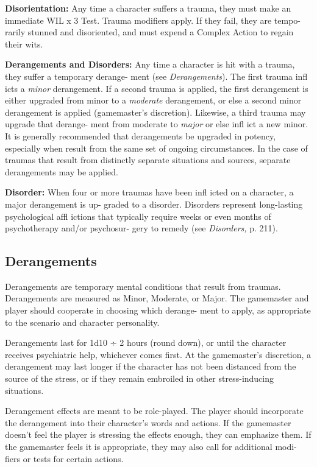 \textbf{Disorientation:} Any time a character suffers a 
trauma, they must make an immediate WIL x 3 Test. 
Trauma modifiers apply. If they fail, they are tempo-
rarily stunned and disoriented, and must expend a 
Complex Action to regain their wits.

\textbf{Derangements and Disorders:} Any time a character 
is hit with a trauma, they suffer a temporary derange-
ment (see \textit{Derangements}). The first trauma infl icts a 
\textit{minor} derangement. If a second trauma is applied, 
the first derangement is either upgraded from minor 
to a \textit{moderate }derangement, or else a second minor 
derangement is applied (gamemaster's discretion). 
Likewise, a third trauma may upgrade that derange-
ment from moderate to \textit{major} or else infl ict a new 
minor. It is generally recommended that derangements 
be upgraded in potency, especially when result from 
the same set of ongoing circumstances. In the case of 
traumas that result from distinctly separate situations 
and sources, separate derangements may be applied.

\textbf{Disorder:} When four or more traumas have been 
infl icted on a character, a major derangement is up-
graded to a disorder. Disorders represent long-lasting 
psychological affl ictions that typically require weeks 
or even months of psychotherapy and/or psychosur-
gery to remedy (see \textit{Disorders,} p. 211).

\subsection{Derangements}

Derangements are temporary mental conditions that 
result from traumas. Derangements are measured as 
Minor, Moderate, or Major. The gamemaster and 
player should cooperate in choosing which derange-
ment to apply, as appropriate to the scenario and 
character personality.

Derangements last for 1d10 ÷ 2 hours (round 
down), or until the character receives psychiatric help, 
whichever comes first. At the gamemaster's discretion, 
a derangement may last longer if the character has not 
been distanced from the source of the stress, or if they 
remain embroiled in other stress-inducing situations.

Derangement effects are meant to be role-played. 
The player should incorporate the derangement into 
their character's words and actions. If the gamemaster 
doesn't feel the player is stressing the effects enough, 
they can emphasize them. If the gamemaster feels it is 
appropriate, they may also call for additional modi-
fiers or tests for certain actions.

